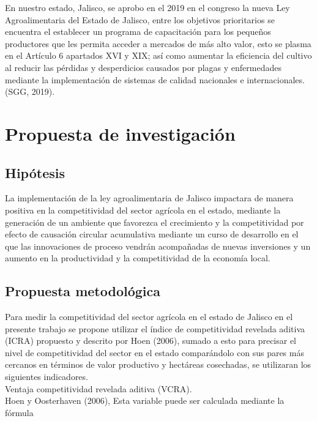 \documentclass[a4paper]{article}
\begin{document}
En nuestro estado, Jalisco, se aprobo en el 2019 en el congreso la nueva Ley Agroalimentaria del Estado de Jalisco, entre los objetivos prioritarios se encuentra el establecer un programa de capacitación para los pequeños productores que les permita acceder a mercados de más alto valor, esto se plasma en el Artículo 6 apartados XVI y XIX; así como aumentar la eficiencia del cultivo al reducir las pérdidas y desperdicios causados por plagas y enfermedades mediante la implementación de sistemas de calidad nacionales e internacionales. \cite{SGG19}(SGG, 2019).



\section{Propuesta de investigación}

\subsection{Hipótesis}

La implementación de la ley agroalimentaria de Jalisco impactara de manera positiva en la competitividad del sector agrícola en el estado, mediante la generación de un ambiente que favorezca el crecimiento y la competitividad por efecto de causación circular acumulativa mediante un curso de desarrollo en el que las innovaciones de proceso vendrán acompañadas de nuevas inversiones y un aumento en la productividad y la competitividad de la economía local.


\subsection{Propuesta metodológica}

Para medir la competitividad del sector agrícola en el estado de Jalisco en el presente trabajo se propone utilizar el índice de competitividad revelada aditiva (ICRA) propuesto y descrito por Hoen (2006), sumado a esto para precisar el nivel de competitividad del sector en el estado comparándolo con sus pares más cercanos en términos de valor productivo y hectáreas cosechadas, se utilizaran los siguientes indicadores.\\

Ventaja competitividad revelada aditiva (VCRA).\\

Hoen y Oosterhaven (2006), Esta variable puede ser calculada mediante la fórmula\\
\end{document}
